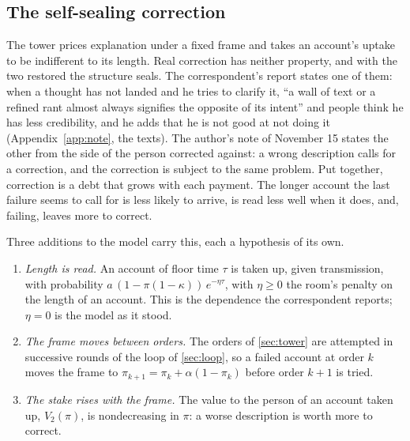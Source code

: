 \subsection{The self-sealing correction}\label{sec:sealing}

The tower prices explanation under a fixed frame and takes an account's uptake to be indifferent to its length. Real correction has neither property, and with the two restored the structure seals. The correspondent's report states one of them: when a thought has not landed and he tries to clarify it, ``a wall of text or a refined rant almost always signifies the opposite of its intent'' and people think he has less credibility, and he adds that he is not good at not doing it (Appendix~\ref{app:note}, the texts). The author's note of November 15 states the other from the side of the person corrected against: a wrong description calls for a correction, and the correction is subject to the same problem. Put together, correction is a debt that grows with each payment. The longer account the last failure seems to call for is less likely to arrive, is read less well when it does, and, failing, leaves more to correct.

Three additions to the model carry this, each a hypothesis of its own.
\begin{enumerate}[label=(S\arabic*)]
\item \emph{Length is read.} An account of floor time $\tau$ is taken up, given transmission, with probability $a\,(1 - \pi(1-\kappa))\,e^{-\eta\tau}$, with $\eta \ge 0$ the room's penalty on the length of an account. This is the dependence the correspondent reports; $\eta = 0$ is the model as it stood.
\item \emph{The frame moves between orders.} The orders of \autoref{sec:tower} are attempted in successive rounds of the loop of \autoref{sec:loop}, so a failed account at order $k$ moves the frame to $\pi_{k+1} = \pi_k + \alpha(1 - \pi_k)$ before order $k+1$ is tried.
\item \emph{The stake rises with the frame.} The value to the person of an account taken up, $V_2(\pi)$, is nondecreasing in $\pi$: a worse description is worth more to correct.
\end{enumerate}


